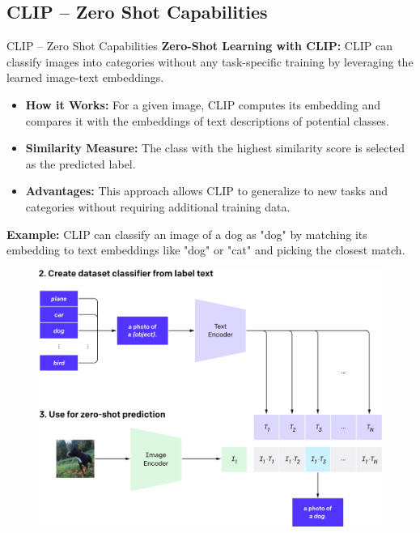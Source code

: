 \subsection{CLIP – Zero Shot Capabilities}
\begin{frame}[allowframebreaks]{CLIP – Zero Shot Capabilities}
    \textbf{Zero-Shot Learning with CLIP:} CLIP can classify images into categories without any task-specific training by leveraging the learned image-text embeddings.

    \begin{itemize}
        \item \textbf{How it Works:} For a given image, CLIP computes its embedding and compares it with the embeddings of text descriptions of potential classes.
        \item \textbf{Similarity Measure:} The class with the highest similarity score is selected as the predicted label.
        \item \textbf{Advantages:} This approach allows CLIP to generalize to new tasks and categories without requiring additional training data.
    \end{itemize}
\framebreak
    \textbf{Example:} CLIP can classify an image of a dog as "dog" by matching its embedding to text embeddings like "dog" or "cat" and picking the closest match.
    \begin{figure}
        \centering
        \includegraphics[width=1\textwidth,height=0.7\textheight,keepaspectratio]{images/video/slide_55_1_img.jpg}
    \end{figure}

\end{frame}
